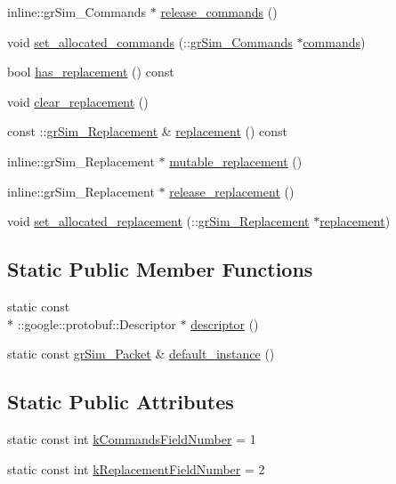 \begin{DoxyCompactItemize}
\item 
inline\-::gr\-Sim\-\_\-\-Commands $\ast$ \hyperlink{classgr_sim___packet_a6860cad9ca6d4381103d48d3840dcaff}{release\-\_\-commands} ()
\item 
void \hyperlink{classgr_sim___packet_a34571f0630a01a00b4b952204fee14fd}{set\-\_\-allocated\-\_\-commands} (\-::\hyperlink{classgr_sim___commands}{gr\-Sim\-\_\-\-Commands} $\ast$\hyperlink{classgr_sim___packet_a3198505f4a5ef2d22038efee9331a760}{commands})
\item 
bool \hyperlink{classgr_sim___packet_ad0a738e8174ef42182b65cf66bb6e548}{has\-\_\-replacement} () const 
\item 
void \hyperlink{classgr_sim___packet_a35441a2b78c7271875ada4c0b5f6c6b3}{clear\-\_\-replacement} ()
\item 
const \-::\hyperlink{classgr_sim___replacement}{gr\-Sim\-\_\-\-Replacement} \& \hyperlink{classgr_sim___packet_a51fbcaf5f35b5a58f466a8d9564d8557}{replacement} () const 
\item 
inline\-::gr\-Sim\-\_\-\-Replacement $\ast$ \hyperlink{classgr_sim___packet_aab5119804259783bd9c62b55cf3de3c2}{mutable\-\_\-replacement} ()
\item 
inline\-::gr\-Sim\-\_\-\-Replacement $\ast$ \hyperlink{classgr_sim___packet_a6242dd5bd6fe420705b46c5b72a912be}{release\-\_\-replacement} ()
\item 
void \hyperlink{classgr_sim___packet_ae075bc0d2eb4046c49ebf0892d5c0909}{set\-\_\-allocated\-\_\-replacement} (\-::\hyperlink{classgr_sim___replacement}{gr\-Sim\-\_\-\-Replacement} $\ast$\hyperlink{classgr_sim___packet_a51fbcaf5f35b5a58f466a8d9564d8557}{replacement})
\end{DoxyCompactItemize}
\subsection*{Static Public Member Functions}
\begin{DoxyCompactItemize}
\item 
static const \\*
\-::google\-::protobuf\-::\-Descriptor $\ast$ \hyperlink{classgr_sim___packet_a7b47a09ab956e4d498c7c27ceb90088a}{descriptor} ()
\item 
static const \hyperlink{classgr_sim___packet}{gr\-Sim\-\_\-\-Packet} \& \hyperlink{classgr_sim___packet_ab1b807bec335f075168233554889c825}{default\-\_\-instance} ()
\end{DoxyCompactItemize}
\subsection*{Static Public Attributes}
\begin{DoxyCompactItemize}
\item 
static const int \hyperlink{classgr_sim___packet_a6aa374ce99b12bf2ccb944fa43fdf144}{k\-Commands\-Field\-Number} = 1
\item 
static const int \hyperlink{classgr_sim___packet_ab1d1c00749a6d91bf3fe792bbec2ba59}{k\-Replacement\-Field\-Number} = 2
\end{DoxyCompactItemize}
